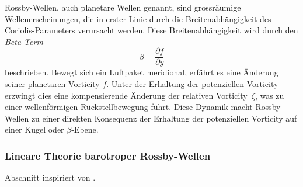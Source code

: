 
Rossby-Wellen, auch planetare Wellen genannt, sind grossräumige
Wellenerscheinungen, die in erster Linie durch die Breitenabhängigkeit des
Coriolis-Parameters verursacht werden. Diese Breitenabhängigkeit wird durch den \emph{Beta-Term}
\begin{equation}
	\beta = \frac{\partial f}{\partial y}
	\label{rossby:eq:beta_term}
\end{equation}
beschrieben. Bewegt sich ein Luftpaket meridional, erfährt es eine Änderung seiner planetaren Vorticity \(f\). Unter der Erhaltung der potenziellen Vorticity erzwingt dies eine kompensierende Änderung der relativen Vorticity~\(\zeta\), was zu einer wellenförmigen Rückstellbewegung führt.
Diese Dynamik macht Rossby-Wellen zu einer direkten Konsequenz der Erhaltung der potenziellen Vorticity auf einer Kugel oder \(\beta\)-Ebene.

\subsubsection{Lineare Theorie barotroper Rossby-Wellen}

Abschnitt inspiriert von \cite{rossby:mueller2018}.

